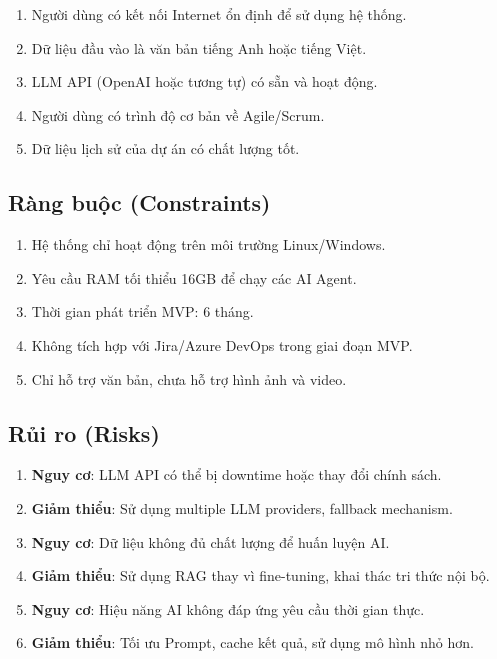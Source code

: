 \documentclass[12pt,a4paper]{report}
\begin{document}
\begin{enumerate}
\item Người dùng có kết nối Internet ổn định để sử dụng hệ thống.
\item Dữ liệu đầu vào là văn bản tiếng Anh hoặc tiếng Việt.
\item LLM API (OpenAI hoặc tương tự) có sẵn và hoạt động.
\item Người dùng có trình độ cơ bản về Agile/Scrum.
\item Dữ liệu lịch sử của dự án có chất lượng tốt.
\end{enumerate}

\subsection{Ràng buộc (Constraints)}

\begin{enumerate}
\item Hệ thống chỉ hoạt động trên môi trường Linux/Windows.
\item Yêu cầu RAM tối thiểu 16GB để chạy các AI Agent.
\item Thời gian phát triển MVP: 6 tháng.
\item Không tích hợp với Jira/Azure DevOps trong giai đoạn MVP.
\item Chỉ hỗ trợ văn bản, chưa hỗ trợ hình ảnh và video.
\end{enumerate}

\subsection{Rủi ro (Risks)}

\begin{enumerate}
\item \textbf{Nguy cơ}: LLM API có thể bị downtime hoặc thay đổi chính sách.
\item \textbf{Giảm thiểu}: Sử dụng multiple LLM providers, fallback mechanism.
\item \textbf{Nguy cơ}: Dữ liệu không đủ chất lượng để huấn luyện AI.
\item \textbf{Giảm thiểu}: Sử dụng RAG thay vì fine-tuning, khai thác tri thức nội bộ.
\item \textbf{Nguy cơ}: Hiệu năng AI không đáp ứng yêu cầu thời gian thực.
\item \textbf{Giảm thiểu}: Tối ưu Prompt, cache kết quả, sử dụng mô hình nhỏ hơn.
\end{enumerate}
\end{document}
